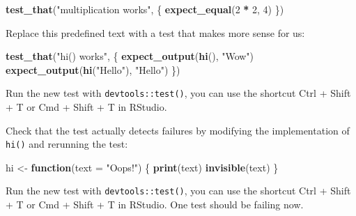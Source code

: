 \documentclass[]{book}
\newenvironment{Shaded}{\begin{snugshade}}{\end{snugshade}}
\newcommand{\ControlFlowTok}[1]{\textcolor[rgb]{0.13,0.29,0.53}{\textbf{#1}}}
\newcommand{\DataTypeTok}[1]{\textcolor[rgb]{0.13,0.29,0.53}{#1}}
\newcommand{\DecValTok}[1]{\textcolor[rgb]{0.00,0.00,0.81}{#1}}
\newcommand{\KeywordTok}[1]{\textcolor[rgb]{0.13,0.29,0.53}{\textbf{#1}}}
\newcommand{\NormalTok}[1]{#1}
\newcommand{\OperatorTok}[1]{\textcolor[rgb]{0.81,0.36,0.00}{\textbf{#1}}}
\newcommand{\StringTok}[1]{\textcolor[rgb]{0.31,0.60,0.02}{#1}}
\begin{document}
\begin{Shaded}
\begin{Highlighting}[]
\KeywordTok{test_that}\NormalTok{(}\StringTok{"multiplication works"}\NormalTok{, \{}
  \KeywordTok{expect_equal}\NormalTok{(}\DecValTok{2} \OperatorTok{*}\StringTok{ }\DecValTok{2}\NormalTok{, }\DecValTok{4}\NormalTok{)}
\NormalTok{\})}
\end{Highlighting}
\end{Shaded}

Replace this predefined text with a test that makes more sense for us:

\begin{Shaded}
\begin{Highlighting}[]
\KeywordTok{test_that}\NormalTok{(}\StringTok{"hi() works"}\NormalTok{, \{}
  \KeywordTok{expect_output}\NormalTok{(}\KeywordTok{hi}\NormalTok{(), }\StringTok{"Wow"}\NormalTok{)}
  \KeywordTok{expect_output}\NormalTok{(}\KeywordTok{hi}\NormalTok{(}\StringTok{"Hello"}\NormalTok{), }\StringTok{"Hello"}\NormalTok{)}
\NormalTok{\})}
\end{Highlighting}
\end{Shaded}

Run the new test with \texttt{devtools::test()}, you can use the shortcut Ctrl + Shift + T or Cmd + Shift + T in RStudio.

Check that the test actually detects failures by modifying the implementation of \texttt{hi()} and rerunning the test:

\begin{Shaded}
\begin{Highlighting}[]
\NormalTok{hi <-}\StringTok{ }\ControlFlowTok{function}\NormalTok{(}\DataTypeTok{text =} \StringTok{"Oops!"}\NormalTok{) \{}
  \KeywordTok{print}\NormalTok{(text)}
  \KeywordTok{invisible}\NormalTok{(text)}
\NormalTok{\}}
\end{Highlighting}
\end{Shaded}

Run the new test with \texttt{devtools::test()}, you can use the shortcut Ctrl + Shift + T or Cmd + Shift + T in RStudio.
One test should be failing now.

\hypertarget{section}{%
\chapter{}\label{section}}
\end{document}
